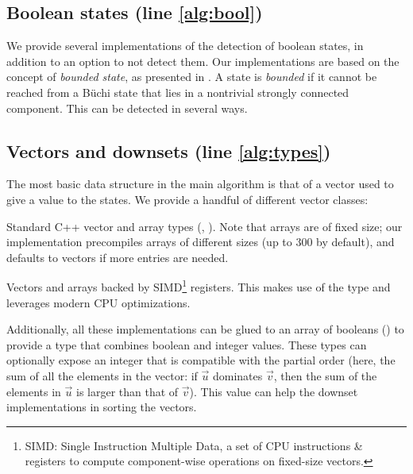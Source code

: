 \documentclass[runningheads,a4paper]{llncs}
\begin{document}
\subsection{Boolean states (line \ref{alg:bool})}\label{sec:implem-bool}

We provide several implementations of the detection of boolean states, in
addition to an option to not detect them.  Our implementations are based on the
concept of \emph{bounded state}, as presented in \cite{bohy14}.  A state is
\emph{bounded} if it cannot be reached from a Büchi state that lies in a
nontrivial strongly connected component.  This 
can be detected in
several ways.%

\subsection{Vectors and downsets (line \ref{alg:types})}\label{sec:vecds}

The most basic data structure in the main algorithm is that of a vector used to
give a value to the states.  We provide a handful of different vector
classes:
\begin{compactitem}
\item Standard C++ vector and array types (,\linebreak
  ).  Note that arrays are of fixed size; our implementation
  precompiles arrays of different sizes (up to \(300\) by default),
  and defaults to vectors if more entries are needed.
\item Vectors and arrays backed by SIMD\footnote{SIMD: Single Instruction
  Multiple Data, a set of CPU instructions \& registers to compute
  component-wise operations on fixed-size vectors.} registers.  This makes use of the
  type  and leverages modern CPU
  optimizations.
\end{compactitem}

Additionally, all these implementations can be glued to an array of booleans
() to provide a type that combines boolean and integer
values.  These types can optionally expose an integer that is compatible with
the partial order (here, the sum of all the elements in the vector: if
\(\vec{u}\) dominates \(\vec{v}\), then the sum of the elements in \(\vec{u}\) is
larger than that of \(\vec{v}\)).  This value can help the downset implementations
in sorting the vectors.
\end{document}
